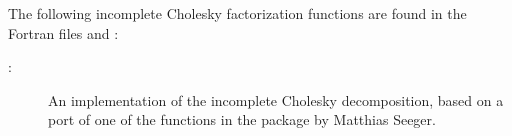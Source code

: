 The following incomplete Cholesky factorization functions are found in the Fortran files  and  :
\begin{description}


    \item[:] An implementation of the incomplete Cholesky decomposition, based on a port of one of the functions in the  package by Matthias Seeger.


\end{description}

